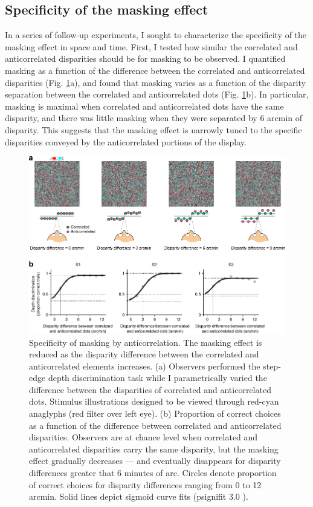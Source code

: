 \subsection{Specificity of the masking effect}
In a series of follow-up experiments, I sought to characterize the specificity of the masking effect in space and time. First, I tested how similar the correlated and anticorrelated disparities should be for masking to be observed. I quantified masking as a function of the difference between the correlated and anticorrelated disparities (Fig. \ref{fig:c2f3}a), and found that masking varies as a function of the disparity separation between the correlated and anticorrelated dots (Fig. \ref{fig:c2f3}b). In particular, masking is maximal when correlated and anticorrelated dots have the same disparity, and there was little masking when they were separated by 6 arcmin of disparity. This suggests that the masking effect is narrowly tuned to the specific disparities conveyed by the anticorrelated portions of the display.

\begin{figure}
  \centering
  \includegraphics{Fig3}
  \caption[Specificity of masking by anticorrelation.]{Specificity of masking by anticorrelation. The masking effect is reduced as the disparity difference between the correlated and anticorrelated elements increases. (a) Observers performed the step-edge depth discrimination task while I parametrically varied the difference between the disparities of correlated and anticorrelated dots. Stimulus illustrations designed to be viewed through red-cyan anaglyphs (red filter over left eye). (b) Proportion of correct choices as a function of the difference between correlated and anticorrelated disparities. Observers are at chance level when correlated and anticorrelated disparities carry the same disparity, but the masking effect gradually decreases --- and eventually disappears for disparity differences greater that 6 minutes of arc. Circles denote proportion of correct choices for disparity differences ranging from 0 to 12 arcmin. Solid lines depict sigmoid curve fits (psignifit 3.0 \cite{Frund:2011aa}).}
  \label{fig:c2f3}
\end{figure}


